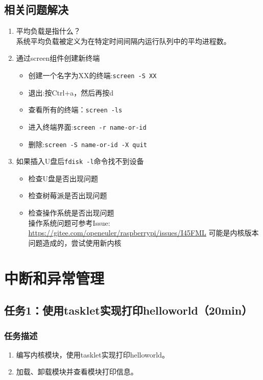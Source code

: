 \documentclass{article}
\begin{document}
\newpage

\subsection{相关问题解决}

\begin{enumerate}

    \item 平均负载是指什么？\\
    系统平均负载被定义为在特定时间间隔内运行队列中的平均进程数。
    \item 通过screen组件创建新终端
    \begin{itemize}
        \item 创建一个名字为XX的终端:\verb|screen -S XX|
        \item 退出:按Ctrl+a，然后再按d
        \item 查看所有的终端：\verb|screen -ls|
        \item 进入终端界面:\verb|screen -r name-or-id|
        \item 删除:\verb|screen -S name-or-id -X quit|
    \end{itemize}
    \item 如果插入U盘后\verb|fdisk -l|命令找不到设备
        \begin{itemize}
        \item 检查U盘是否出现问题
        \item 检查树莓派是否出现问题
        \item 检查操作系统是否出现问题\\
        操作系统问题可参考Issue: \url{https://gitee.com/openeuler/raspberrypi/issues/I45FML}
        可能是内核版本问题造成的，尝试使用新内核
    \end{itemize}
\end{enumerate}
\newpage


\section{中断和异常管理}
\subsection{任务1：使用tasklet实现打印helloworld（20min）}

\subsubsection{任务描述}
\begin{enumerate}
    \item 编写内核模块，使用tasklet实现打印helloworld。
    \item 加载、卸载模块并查看模块打印信息。
\end{enumerate}
\end{document}
